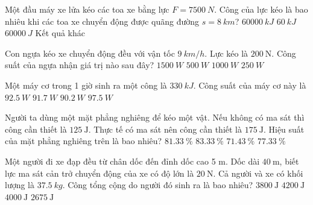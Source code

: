 \begin{ex}
	Một đầu máy xe lửa kéo các toa xe bằng lực $F=\SI{7500}{N}$. Công của lực kéo là bao nhiêu khi các toa xe chuyển động được quãng đường $s=\SI{8}{km}$?
	\choice
	{\True $\SI{60000}{kJ}$}
	{$\SI{60}{kJ}$}
	{$\SI{60000}{J}$}
	{Kết quả khác}
\end{ex}		
\begin{ex}
	Con ngựa kéo xe chuyển động đều với vận tốc $\SI{9}{km/h}$. Lực kéo là $\SI{200}{\newton}$. Công suất của ngựa nhận giá trị nào sau đây?
	\choice
	{$\SI{1500}{W}$}
	{\True $\SI{500}{W}$}
	{$\SI{1000}{W}$}
	{$\SI{250}{W}$}
\end{ex}
\begin{ex}
	Một máy cơ trong 1 giờ sinh ra một công là $\SI{330}{kJ}$. Công suất của máy cơ này là
	\choice
	{$\SI{92.5}{W}$}
	{\True $\SI{91.7}{W}$}
	{$\SI{90.2}{W}$}
	{$\SI{97.5}{W}$}
\end{ex}
\begin{ex}
	Người ta dùng một mặt phẳng nghiêng để kéo một vật. Nếu không có ma sát thì công cần thiết là $\SI{125}{\joule}$. Thực tế có ma sát nên công cần thiết là $\SI{175}{\joule}$. Hiệu suất của mặt phẳng nghiêng trên là bao nhiêu?
	\choice
	{$\SI{81.33}{\%}$}
	{$\SI{83.33}{\%}$}
	{\True $\SI{71.43}{\%}$}
	{$\SI{77.33}{\%}$}
\end{ex}
\begin{ex}
	Một người đi xe đạp đều từ chân dốc đến đỉnh dốc cao 5 m. Dốc dài $\SI{40}{\meter}$, biết lực ma sát cản trở chuyển động của xe có độ lớn là $\SI{20}{\newton}$. Cả người và xe có khối lượng là $\SI{37.5}{kg}$. Công tổng cộng do người đó sinh ra là bao nhiêu?	
	\choice
	{$\SI{3800}{\joule}$}
	{$\SI{4200}{\joule}$}
	{$\SI{4000}{\joule}$}
	{\True $\SI{2675}{\joule}$}
\end{ex}
